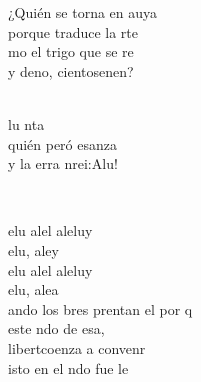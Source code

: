 \documentclass[12pt]{article}
\begin{document}
\begin{multicols*}{2}
\begin{cancion}
\jump
	¿Quién se torna en auya\\
	porque traduce la rte\\
	mo el trigo que se re \\
	y deno, cientosenen?\\\jump\\
	\begin{chorus}%
	lu nta \\
	quién peró esanza\\
	y la erra nrei:Alu!\\
	\end{chorus}%
	\jump\\
\end{cancion}%

\begin{cancion}%
	elu  alel aleluy\\
	elu, aley\\
	elu  alel aleluy\\
	elu, alea\\
\jump
	ando los bres prentan el por q \\
	 este ndo de esa,\\
	 libertcoenza a convenr\\
	isto en el ndo fue le\\
\end{cancion}%


\end{multicols*}
\end{document}
